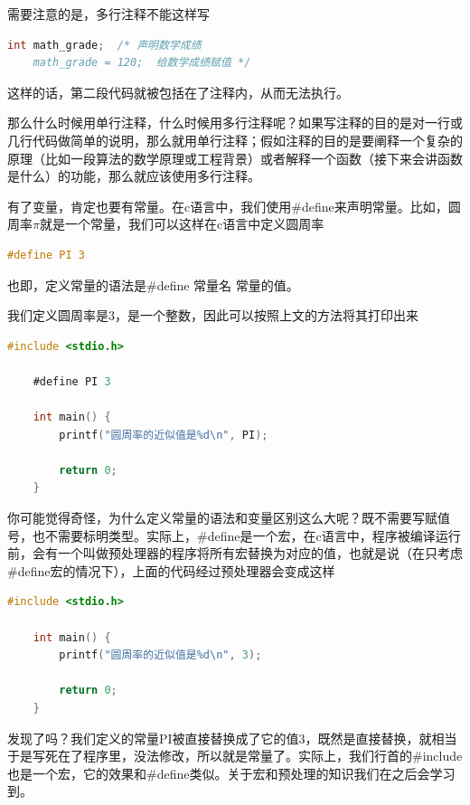 需要注意的是，多行注释不能这样写

\begin{lstlisting}[language=C]
    int math_grade;  /* 声明数学成绩 
    math_grade = 120;  给数学成绩赋值 */
\end{lstlisting}

这样的话，第二段代码就被包括在了注释内，从而无法执行。

那么什么时候用单行注释，什么时候用多行注释呢？如果写注释的目的是对一行或几行代码做简单的说明，那么就用单行注释；假如注释的目的是要阐释一个复杂的原理（比如一段算法的数学原理或工程背景）或者解释一个函数（接下来会讲函数是什么）的功能，那么就应该使用多行注释。

有了变量，肯定也要有常量。在c语言中，我们使用\#define来声明常量。比如，圆周率$\pi$就是一个常量，我们可以这样在c语言中定义圆周率

\begin{lstlisting}[language=C]
    #define PI 3 
\end{lstlisting}

也即，定义常量的语法是\#define 常量名 常量的值。

我们定义圆周率是3，是一个整数，因此可以按照上文的方法将其打印出来

\begin{lstlisting}[language=C]
    #include <stdio.h>

    #define PI 3

    int main() {
        printf("圆周率的近似值是%d\n", PI);

        return 0;
    }
\end{lstlisting}

你可能觉得奇怪，为什么定义常量的语法和变量区别这么大呢？既不需要写赋值号，也不需要标明类型。实际上，\#define是一个宏，在c语言中，程序被编译运行前，会有一个叫做预处理器的程序将所有宏替换为对应的值，也就是说（在只考虑\#define宏的情况下），上面的代码经过预处理器会变成这样

\begin{lstlisting}[language=C]
    #include <stdio.h>

    int main() {
        printf("圆周率的近似值是%d\n", 3);

        return 0;
    }
\end{lstlisting}

发现了吗？我们定义的常量PI被直接替换成了它的值$3$，既然是直接替换，就相当于是写死在了程序里，没法修改，所以就是常量了。实际上，我们行首的\#include也是一个宏，它的效果和\#define类似。关于宏和预处理的知识我们在之后会学习到。

